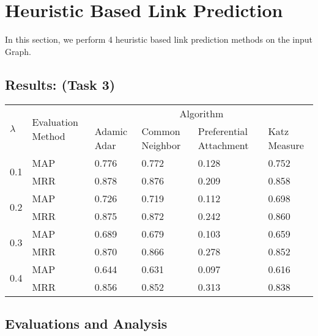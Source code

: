 \documentclass[12pt, a4paper]{article}
\begin{document}
\section{Heuristic Based Link Prediction}
In this section, we perform 4 heuristic based link prediction methods on the input Graph.
\subsection*{Results: (Task 3)}
\begin{center}
\begin{tabular}{ |p{0.6cm}|p{2.5cm}|p{2.5cm}|p{2.5cm}|p{2.5cm}|p{2.5cm}|  }
 \hline
 \multirow{2}{0.1cm}{$\lambda$} & \multirow{2}{3cm}{Evaluation Method} & \multicolumn{4}{c|}{Algorithm} \\
 \cline{3-6}
  &   & Adamic Adar & Common \newline Neighbor & Preferential \newline Attachment & Katz Measure \\
 \hline
 \multirow{2}{*}{0.1} & MAP & 0.776   & 0.772   &  0.128  & 0.752    \\
 \cline{2-6}
 & MRR & 0.878   & 0.876   &  0.209  &  0.858   \\
 \hline
 \multirow{2}{*}{0.2} & MAP & 0.726   & 0.719   &  0.112  &  0.698   \\
 \cline{2-6}
 & MRR & 0.875   & 0.872   &  0.242  & 0.860    \\
 \hline
 \multirow{2}{*}{0.3} & MAP & 0.689   & 0.679   &  0.103  &  0.659   \\
 \cline{2-6}
 & MRR & 0.870   & 0.866   &  0.278  &  0.852   \\
 \hline
 \multirow{2}{*}{0.4} & MAP & 0.644   & 0.631   &  0.097  & 0.616    \\
 \cline{2-6}
 & MRR & 0.856   & 0.852   &  0.313  & 0.838    \\
 \hline

\end{tabular}
\end{center}

\subsection*{Evaluations and Analysis}
\end{document}
